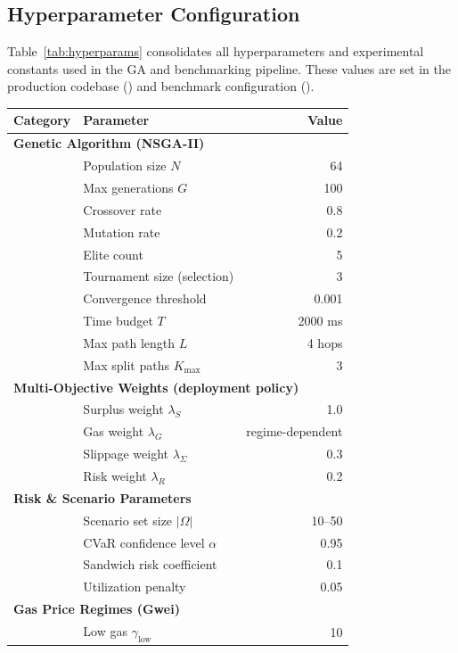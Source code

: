 \documentclass[11pt]{article}
\newcommand{\1}{\mathbf{1}}  %
\begin{document}
\subsection{Hyperparameter Configuration}
\label{sec:hyperparams}
Table~\ref{tab:hyperparams} consolidates all hyperparameters and experimental constants used in the GA and benchmarking pipeline. These values are set in the production codebase () and benchmark configuration ().

\begin{table}[t]
\centering
\small
\begin{tabular}{llr}
\toprule
Category & Parameter & Value \\ \midrule
\multicolumn{3}{l}{\textbf{Genetic Algorithm (NSGA-II)}} \\
  & Population size $N$ & 64 \\
  & Max generations $G$ & 100 \\
  & Crossover rate & 0.8 \\
  & Mutation rate & 0.2 \\
  & Elite count & 5 \\
  & Tournament size (selection) & 3 \\
  & Convergence threshold & 0.001 \\
  & Time budget $T$ & 2000 ms \\
  & Max path length $L$ & 4 hops \\
  & Max split paths $K_{\max}$ & 3 \\
\midrule
\multicolumn{3}{l}{\textbf{Multi-Objective Weights (deployment policy)}} \\
  & Surplus weight $\lambda_S$ & 1.0 \\
  & Gas weight $\lambda_G$ & regime-dependent \\
  & Slippage weight $\lambda_\Sigma$ & 0.3 \\
  & Risk weight $\lambda_R$ & 0.2 \\
\midrule
\multicolumn{3}{l}{\textbf{Risk \& Scenario Parameters}} \\
  & Scenario set size $|\Omega|$ & 10--50 \\
  & CVaR confidence level $\alpha$ & 0.95 \\
  & Sandwich risk coefficient & 0.1 \\
  & Utilization penalty & 0.05 \\
\midrule
\multicolumn{3}{l}{\textbf{Gas Price Regimes (Gwei)}} \\
  & Low gas $\gamma_{\text{low}}$ & 10 \\

\end{tabular}
\end{table}
\end{document}
